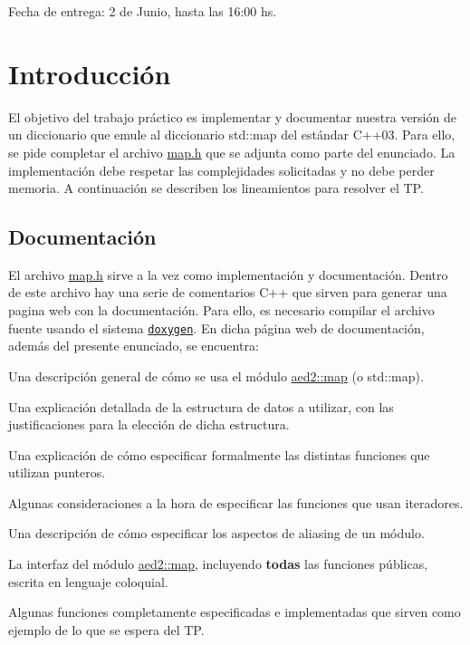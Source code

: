 
\begin{DoxyItemize}
\item Fecha de entrega\+: 2 de Junio, hasta las 16\+:00 hs.
\end{DoxyItemize}\hypertarget{Enunciado_intro-enunciado}{}\section{Introducción}\label{Enunciado_intro-enunciado}
El objetivo del trabajo práctico es implementar y documentar nuestra versión de un diccionario que emule al diccionario {\ttfamily std\+::map} del estándar C++03. Para ello, se pide completar el archivo {\ttfamily \hyperlink{map_8h}{map.\+h}} que se adjunta como parte del enunciado. La implementación debe respetar las complejidades solicitadas y no debe perder memoria. A continuación se describen los lineamientos para resolver el TP.\hypertarget{Enunciado_intro-doc}{}\subsection{Documentación}\label{Enunciado_intro-doc}
El archivo {\ttfamily \hyperlink{map_8h}{map.\+h}} sirve a la vez como implementación y documentación. Dentro de este archivo hay una serie de comentarios C++ que sirven para generar una pagina web con la documentación. Para ello, es necesario compilar el archivo fuente usando el sistema \href{http://www.doxygen.org}{\tt doxygen}. En dicha página web de documentación, además del presente enunciado, se encuentra\+:


\begin{DoxyItemize}
\item Una descripción general de cómo se usa el módulo {\ttfamily \hyperlink{classaed2_1_1map}{aed2\+::map}} (o {\ttfamily std\+::map}).
\item Una explicación detallada de la estructura de datos a utilizar, con las justificaciones para la elección de dicha estructura.
\item Una explicación de cómo especificar formalmente las distintas funciones que utilizan punteros.
\item Algunas consideraciones a la hora de especificar las funciones que usan iteradores.
\item Una descripción de cómo especificar los aspectos de aliasing de un módulo.
\item La interfaz del módulo {\ttfamily \hyperlink{classaed2_1_1map}{aed2\+::map}}, incluyendo {\bfseries todas} las funciones públicas, escrita en lenguaje coloquial.
\item Algunas funciones completamente especificadas e implementadas que sirven como ejemplo de lo que se espera del TP.
\end{DoxyItemize}

